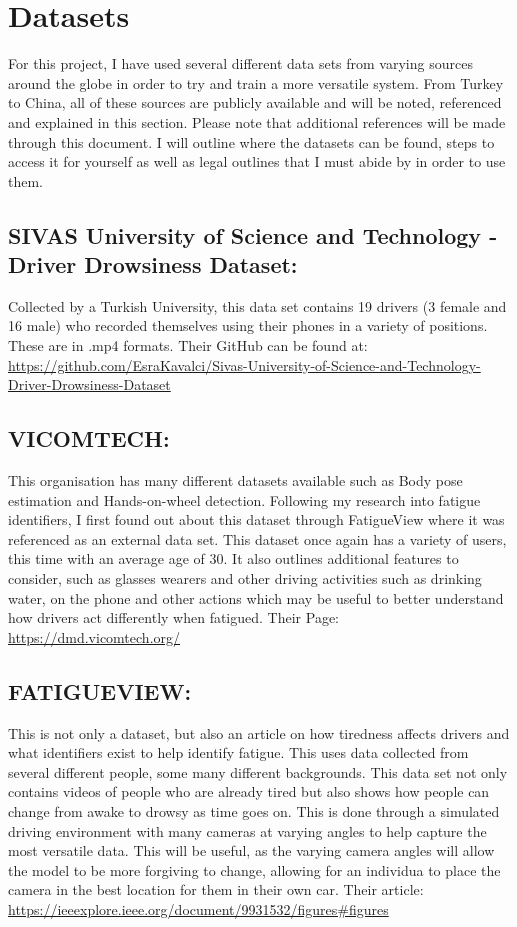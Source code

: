 \chapter*{Datasets}

For this project, I have used several different data sets from varying sources around the globe in order to try and train a more
versatile system. From Turkey to China, all of these sources are publicly available and will be noted, referenced and explained in this
section. Please note that additional references will be made through this document. I will outline where the datasets can be found, steps
to access it for yourself as well as legal outlines that I must abide by in order to use them.

\section{SIVAS University of Science and Technology - Driver Drowsiness Dataset:}
Collected by a Turkish University, this data set contains 19 drivers (3 female and 16 male) who recorded themselves using their phones in
a variety of positions. These are in .mp4 formats.
\cite{SUST}
Their GitHub can be found at: \url{https://github.com/EsraKavalci/Sivas-University-of-Science-and-Technology-Driver-Drowsiness-Dataset}

\section{VICOMTECH:}
This organisation has many different datasets available such as Body pose estimation and Hands-on-wheel detection. Following my research
into fatigue identifiers, I first found out about this dataset through FatigueView \cite{fatigueview} where it was referenced as an external data set.
This dataset once again has a variety of users, this time with an average age of 30. It also outlines additional features to consider,
such as glasses wearers and other driving activities such as drinking water, on the phone and other actions which may be useful to better
understand how drivers act differently when fatigued.
Their Page: \url{https://dmd.vicomtech.org/} \cite{vicomtech}

\section{FATIGUEVIEW:}
This is not only a dataset, but also an article on how tiredness affects drivers and what identifiers exist to help identify fatigue.
This uses data collected from several different people, some many different backgrounds. This data set not only contains videos of people
who are already tired but also shows how people can change from awake to drowsy as time goes on. This is done through a simulated driving
environment with many cameras at varying angles to help capture the most versatile data.
This will be useful, as the varying camera angles will allow the model to be more forgiving to change, allowing for an individua to place
the camera in the best location for them in their own car.
Their article: \url{https://ieeexplore.ieee.org/document/9931532/figures#figures} \cite{fatigueview}

